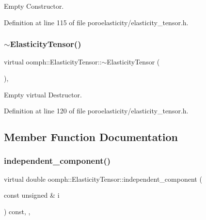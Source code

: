 Empty Constructor. 



Definition at line 115 of file poroelasticity/elasticity\+\_\+tensor.\+h.

\mbox{\label{classoomph_1_1ElasticityTensor_a33d3d0462cfe9c230444ceb27db744d8}} 
\subsubsection{\texorpdfstring{$\sim$\+Elasticity\+Tensor()}{~ElasticityTensor()}\hspace{0.1cm}{\footnotesize\ttfamily [2/2]}}
{\footnotesize\ttfamily virtual oomph\+::\+Elasticity\+Tensor\+::$\sim$\+Elasticity\+Tensor (\begin{DoxyParamCaption}{ }\end{DoxyParamCaption})\hspace{0.3cm}{\ttfamily [inline]}, {\ttfamily [virtual]}}



Empty virtual Destructor. 



Definition at line 120 of file poroelasticity/elasticity\+\_\+tensor.\+h.



\subsection{Member Function Documentation}
\mbox{\label{classoomph_1_1ElasticityTensor_a84b2a9b7a447cf88b2d6b98b5e6e7bd5}} 
\subsubsection{\texorpdfstring{independent\+\_\+component()}{independent\_component()}\hspace{0.1cm}{\footnotesize\ttfamily [1/2]}}
{\footnotesize\ttfamily virtual double oomph\+::\+Elasticity\+Tensor\+::independent\+\_\+component (\begin{DoxyParamCaption}\item[{const unsigned \&}]{i }\end{DoxyParamCaption}) const\hspace{0.3cm}{\ttfamily [inline]}, {\ttfamily [protected]}, {\ttfamily [virtual]}}

